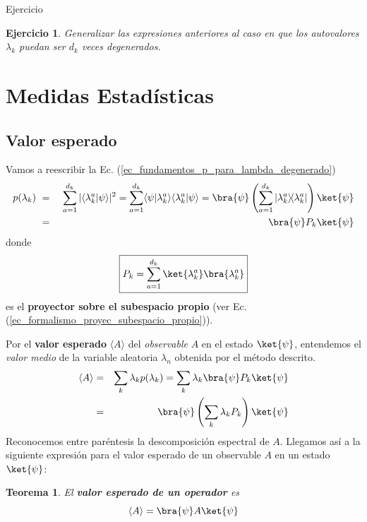 \documentclass[a4paper,11pt]{book} %
\newtheorem{teorema_contador}{Teorema}
\newcommand{\Teorema}[1]{
		\begin{mybox_gray2}{}
			\begin{teorema_contador}
				 #1 
			\end{teorema_contador} 
		\end{mybox_gray2}
	}
\newtheorem{ejercicio_contador}{Ejercicio}
\newcommand{\Ejercicio}[1]{
		\begin{mybox_gray}{Ejercicio} 
			\begin{ejercicio_contador}
				 #1 
			\end{ejercicio_contador} 
		\end{mybox_gray}
	}
\numberwithin{equation}{chapter}
\newcommand{\braket}[2]{\langle #1|#2\rangle}
\newcommand{\ketbra}[2]{| #1\rangle \! \langle #2|}
\begin{document}
	
	\Ejercicio{Generalizar las expresiones anteriores al caso en que los autovalores $\lambda_k$ puedan ser $d_k$ veces degenerados.
	}

	\section{Medidas Estadísticas}
	
		\subsection{Valor esperado}

Vamos a reescribir la Ec. (\ref{ec_fundamentos_p_para_lambda_degenerado})
\begin{eqnarray} \label{ec_fundamentos_p_para_lambda_degenerado_proyector}
p(\lambda_k)~ 
&=& ~ \sum_{a=1}^{d_k}|\braket{\lambda^a_k}{\psi}|^2 
 = \sum_{a=1}^{d_k} \braket{\psi}{\lambda^a_k}\braket{\lambda^a_k}{\psi}  
 =\bra{\psi}\left(\sum_{a=1}^{d_k}\ketbra{\lambda^a_k}{\lambda^a_k}\right) \ket{\psi}\nonumber\\
&=&  \bra{\psi}P_k\ket{\psi} 
\end{eqnarray}    
donde 
	\begin{equation}
	\boxed{P_k = \sum_{a=1}^{d_k} \ket{\lambda^a_k}\bra{\lambda^a_k}}
	\end{equation}
es el \textbf{proyector sobre el subespacio propio} (ver Ec. (\ref{ec_formalismo_proyec_subespacio_propio})).

Por el \textbf{valor esperado} $\langle A\rangle$ del \textit{observable} $A$ en el estado $\ket{\psi}$, entendemos el \textit{valor medio} de la variable aleatoria $\lambda_n$ obtenida por el método descrito. 
\begin{eqnarray}
\langle A\rangle 
	&= &  \sum_k \lambda_k p(\lambda_k)
     =  \sum_k \lambda_k \bra{\psi}P_k\ket{\psi}  \nonumber \\
	&=& \bra{\psi}\left(\sum_k \lambda_k P_k  \right) \ket{\psi} 
\end{eqnarray}
Reconocemos entre paréntesis la descomposición espectral de $A$. Llegamos así a la siguiente expresión para el valor esperado de un observable $A$ en un estado $\ket{\psi}$:
	
	\Teorema{ El \textbf{valor esperado de un operador} es
		\begin{equation}
		\langle A \rangle=\bra{\psi}A \ket{\psi}
		\end{equation}
	}
\end{document}
